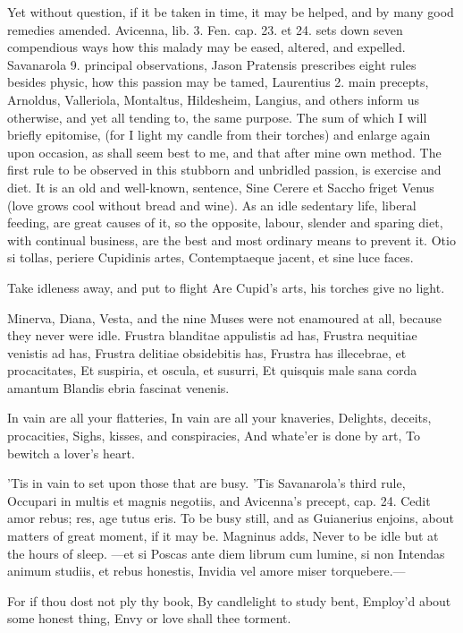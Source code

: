 {Yet without question, if it be taken in time, it may be helped, and by
many good remedies amended. Avicenna, lib. 3. Fen. cap. 23. et 24. sets
down seven compendious ways how this malady may be eased, altered, and
expelled. Savanarola 9. principal observations, Jason Pratensis
prescribes eight rules besides physic, how this passion may be tamed,
Laurentius 2. main precepts, Arnoldus, Valleriola, Montaltus,
Hildesheim, Langius, and others inform us otherwise, and yet all
tending to, the same purpose. The sum of which I will briefly
epitomise, (for I light my candle from their torches) and enlarge again
upon occasion, as shall seem best to me, and that after mine own
method. The first rule to be observed in this stubborn and unbridled
passion, is exercise and diet. It is an old and well-known, sentence,
Sine Cerere et Saccho friget Venus (love grows cool without bread and
wine). As an idle sedentary life, liberal feeding, are great
causes of it, so the opposite, labour, slender and sparing diet, with
continual business, are the best and most ordinary means to prevent it.
Otio si tollas, periere Cupidinis artes,
Contemptaeque jacent, et sine luce faces.

Take idleness away, and put to flight
Are Cupid's arts, his torches give no light.

Minerva, Diana, Vesta, and the nine Muses were not enamoured at all,
because they never were idle.
Frustra blanditae appulistis ad has,
Frustra nequitiae venistis ad has,
Frustra delitiae obsidebitis has,
Frustra has illecebrae, et procacitates,
Et suspiria, et oscula, et susurri,
Et quisquis male sana corda amantum
Blandis ebria fascinat venenis.

In vain are all your flatteries,
In vain are all your knaveries,
Delights, deceits, procacities,
Sighs, kisses, and conspiracies,
And whate'er is done by art,
To bewitch a lover's heart.

'Tis in vain to set upon those that are busy. 'Tis Savanarola's third
rule, Occupari in multis et magnis negotiis, and Avicenna's precept,
cap. 24. Cedit amor rebus; res, age tutus eris. To be busy still,
and as Guianerius enjoins, about matters of great moment, if it
may be. Magninus adds, Never to be idle but at the hours of
sleep.
---et si
Poscas ante diem librum cum lumine, si non
Intendas animum studiis, et rebus honestis,
Invidia vel amore miser torquebere.---

For if thou dost not ply thy book,
By candlelight to study bent,
Employ'd about some honest thing,
Envy or love shall thee torment.

}
